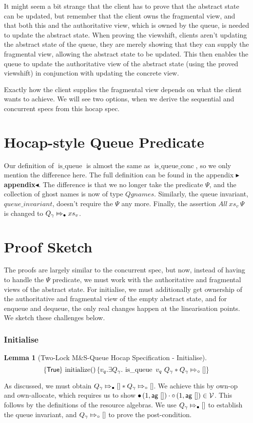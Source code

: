\documentclass[a4paper, 11pt]{report}
\newtheorem{lemma}[theorem]{Lemma}
\newcommand{\initialise}{\operatorname{initialize}}
\newcommand{\isqueue}{\operatorname{is\_queue}}
\newcommand{\isqueueconc}{\operatorname{is\_queue\_conc}}
\newcommand{\Qg}{Q_\gname}
\newcommand{\Vl}{\ensuremath{\mathcal{V}}}
\newcommand{\abstractstatefullfrag}[2]{#1 \Mapsto_{\circ} #2}
\newcommand{\abstractstateauth}[2]{#1 \Mapsto_{\bullet} #2}
\newcommand{\tlhocapspecinit}{\hoare{\TRUE}{\initialise \TT}{v_q . \Exists Q_\gname . \isqueue\ v_q \ Q_\gname \star \abstractstatefullfrag{\Qg}{[]}}}
\newcommand{\todo}[1]{{\color[rgb]{.5,0,0}\textbf{$\blacktriangleright$#1$\blacktriangleleft$}}}
\begin{document}
It might seem a bit strange that the client has to prove that the abstract state can be updated, but remember that the client owns the fragmental view, and that both this and the authoritative view, which is owned by the queue, is needed to update the abstract state. When proving the viewshift, clients aren't updating the abstract state of the queue, they are merely showing that they can supply the fragmental view, allowing the abstract state to be updated. This then enables the queue to update the authoritative view of the abstract state (using the proved viewshift) in conjunction with updating the concrete view.

Exactly how the client supplies the fragmental view depends on what the client wants to achieve. We will see two options, when we derive the sequential and concurrent specs from this hocap spec.

\section{Hocap-style Queue Predicate}
\label{TLMSQHOCAP:section:hocap-queue-pred}
Our definition of $\isqueue$ is almost the same as $\isqueueconc$, so we only mention the difference here. The full definition can be found in the appendix \todo{appendix}. The difference is that we no longer take the predicate $\Psi$, and the collection of ghost names is now of type $Qgnames$. Similarly, the queue invariant, $queue\_invariant$, doesn't require the $\Psi$ any more. Finally, the assertion $All \ xs_v \ \Psi$ is changed to $\abstractstateauth{\Qg}{xs_v}$.

\section{Proof Sketch}
\label{TLMSQHOCAP:proof-Sketch}
The proofs are largely similar to the concurrent spec, but now, instead of having to handle the $\Psi$ predicate, we must work with the authoritative and fragmental views of the abstract state. For initialise, we must additionally get ownership of the authoritative and fragmental view of the empty abstract state, and for enqueue and dequeue, the only real changes happen at the linearisation points. We sketch these challenges below.

\subsubsection{Initialise}
\begin{lemma}[Two-Lock M\&S-Queue Hocap Specification - Initialise]\label{TLMSQ:spec:hocap:initialise}
  \begin{equation*}
    \tlhocapspecinit
  \end{equation*}
\end{lemma}
As discussed, we must obtain $\abstractstateauth{\Qg}{[]} \star \abstractstatefullfrag{\Qg}{[]}$. We achieve this by own-op and own-allocate, which requires us to show $\authfull (1, \aginj\ []) \mtimes \authfrag (1, \aginj\ []) \in \Vl$. This follows by the definitions of the resource algebras. We use $\abstractstateauth{\Qg}{[]}$ to establish the queue invariant, and $\abstractstatefullfrag{\Qg}{[]}$ to prove the post-condition.\\
\end{document}
